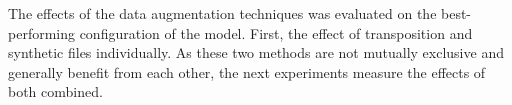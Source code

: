 
The effects of the data augmentation techniques was
evaluated on the best-performing configuration of the model.
First, the effect of transposition and synthetic files
individually. As these two methods are not mutually
exclusive and generally benefit from each other, the next
experiments measure the effects of both combined. 
